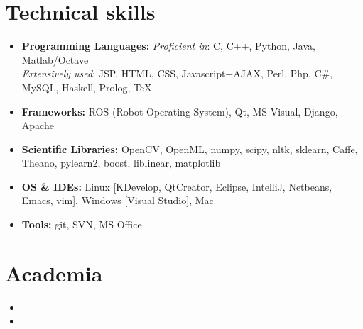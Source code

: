 \documentclass[10pt,letterpaper,sans]{moderncv}        %
\begin{document}
\begin{small}
\begin{itemize}
\end{itemize}
\end{small}

\section{Technical skills}

\vspace{2pt}

\begin{itemize}

\item \textbf{Programming Languages:} \emph{Proficient in}: C, C++, Python, Java, Matlab/Octave \\ \emph{Extensively used}: JSP, HTML, CSS, Javascript+AJAX, Perl, Php, C\#, MySQL, Haskell, Prolog, TeX

\item \textbf{Frameworks:} ROS (Robot Operating System), Qt, MS Visual, Django, Apache

\item \textbf{Scientific Libraries:} OpenCV, OpenML, numpy, scipy, nltk, sklearn, Caffe, Theano, pylearn2, boost, liblinear, matplotlib

\item \textbf{OS \& IDEs:} Linux [KDevelop, QtCreator, Eclipse, IntelliJ, Netbeans, Emacs, vim], Windows [Visual Studio], Mac

\item \textbf{Tools:} git, SVN, MS Office

\end{itemize}

\section{Academia}

\vspace{5pt}

\begin{itemize}

\item{}

\item{}  %

\end{itemize}
\vspace{2pt}
\end{document}
